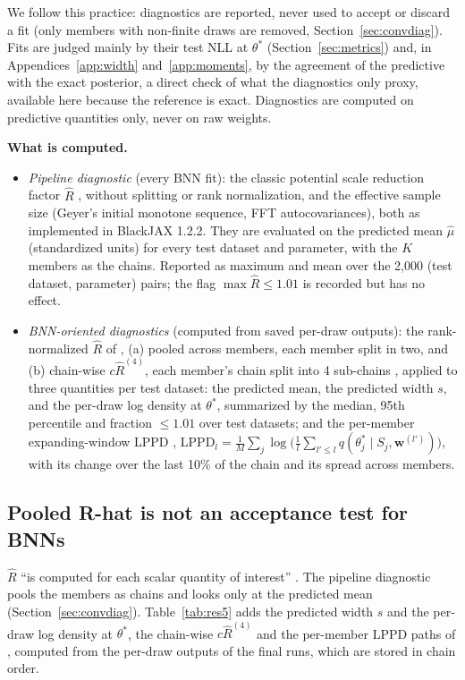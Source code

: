 \documentclass[11pt]{article}
\begin{document}
We follow this practice: diagnostics are reported, never used to accept or discard a fit (only members with
non-finite draws are removed, Section~\ref{sec:convdiag}). Fits are judged mainly by their test NLL at $\theta^\ast$
(Section~\ref{sec:metrics}) and, in Appendices~\ref{app:width} and~\ref{app:moments}, by the agreement of the
predictive with the exact posterior, a direct check of what the diagnostics only proxy, available here because the
reference is exact. Diagnostics are computed on predictive quantities only, never on raw weights.

\textbf{What is computed.}
\begin{itemize}
\item \emph{Pipeline diagnostic} (every BNN fit): the classic potential scale reduction factor $\widehat R$
  \citep{gelman1992inference}, without splitting or rank normalization, and the effective sample size (Geyer's
  initial monotone sequence, FFT autocovariances), both as implemented in BlackJAX 1.2.2. They are evaluated on
  the predicted mean $\hat\mu$ (standardized units) for every test dataset and parameter, with the $K$ members
  as the chains. Reported as maximum and mean over the 2{,}000 (test dataset, parameter) pairs; the flag
  $\max\widehat R\le1.01$ is recorded but has no effect.
\item \emph{BNN-oriented diagnostics} (computed from saved per-draw outputs): the rank-normalized $\widehat R$ of
  \citet{vehtari2021rhat}, (a) pooled across members, each member split in two, and (b) chain-wise
  $c\widehat R^{(4)}$, each member's chain split into 4 sub-chains \citep[App.~B.1]{sommer2024connecting}, applied to
  three quantities per test dataset: the predicted mean, the predicted width $s$, and the per-draw log density at
  $\theta^\ast$, summarized by the median, 95th percentile and fraction $\le1.01$ over test datasets; and the
  per-member expanding-window LPPD \citep[App.~B.2, Eq.~8]{sommer2024connecting},
  $\mathrm{LPPD}_l=\frac1M\sum_j\log\big(\frac1l\sum_{l'\le l}q(\theta^\ast_j\mid S_j,\mathbf w^{(l')})\big)$, with its
  change over the last 10\% of the chain and its spread across members.
\end{itemize}

\subsection{Pooled R-hat is not an acceptance test for BNNs}
\label{sec:res_rhat}
$\widehat R$ ``is computed for each scalar quantity of interest'' \citep{vehtari2021rhat}. The pipeline diagnostic
pools the members as chains and looks only at the predicted mean (Section~\ref{sec:convdiag}).
Table~\ref{tab:res5} adds the predicted width $s$ and the per-draw log density at $\theta^\ast$, the chain-wise
$c\widehat R^{(4)}$ and the per-member LPPD paths of \citet[App.~B]{sommer2024connecting}, computed from the per-draw outputs of the final runs, which are stored in chain order.
\end{document}
